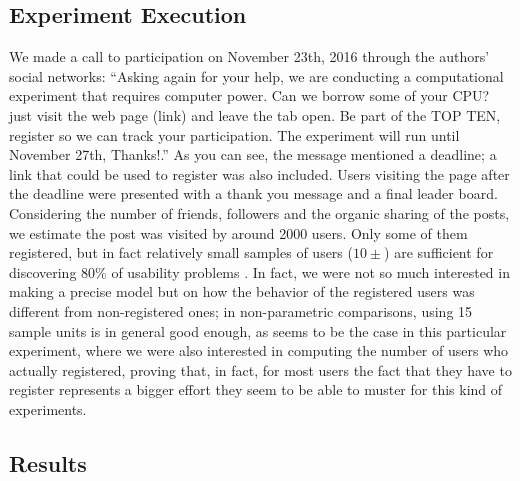 \documentclass{llncs}
\begin{document}
\subsection{Experiment Execution}
We made a call to participation on November 23th,
2016 through the authors' social networks: ``Asking again for your help, we are conducting a computational experiment
that requires computer power. Can we borrow some of your CPU? just visit the web page (link)
and leave the tab open. Be part of the TOP TEN, register so we can track your participation.
The experiment will run until November 27th, Thanks!.'' As you can
see, the message mentioned a deadline; a link that could be used to
register was also included. Users visiting the page after the deadline
were presented with a thank you message and a final leader
board. Considering the number of friends, followers and the organic
sharing of the posts, we estimate the post was visited by around 2000
users. Only some of them registered, but in fact relatively small samples of users ($10\pm$) are sufficient for
discovering 80\% of usability problems \cite{Schmettow2012}. In fact,
we were not so much interested in making a precise model but on how
the behavior of the registered users was different from non-registered
ones; in non-parametric comparisons, using 15 sample units is in general
good enough, as seems to be the case in this particular
experiment, where we were also interested in computing the number of
users who actually registered, proving that, in fact, for most users
the fact that they have to register represents a bigger effort they
seem to be able to muster for this kind of experiments.


\subsection{Results}
\label{sec:results}
\end{document}
